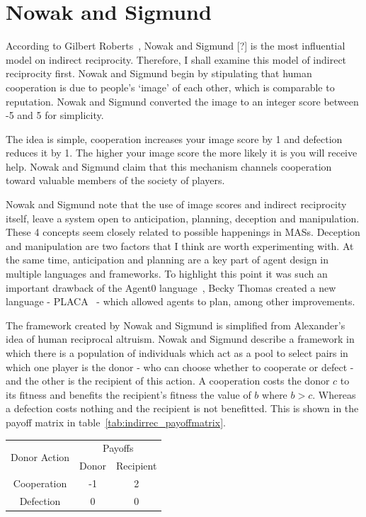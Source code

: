 \documentclass[]{final_report}
\begin{document}
\section{Nowak and Sigmund}
\label{sec:nowak_sig}
According to Gilbert Roberts~\cite{evoldirindir}, Nowak and Sigmund [?] is the most influential model on indirect reciprocity. Therefore, I shall examine this model of indirect reciprocity first. Nowak and Sigmund begin by stipulating that human cooperation is due to people's `image' of each other, which is comparable to reputation. Nowak and Sigmund converted the image to an integer score between -5 and 5 for simplicity.\par
The idea is simple, cooperation increases your image score by 1 and defection reduces it by 1. The higher your image score the more likely it is you will receive help. Nowak and Sigmund claim that this mechanism channels cooperation toward valuable members of the society of players.\par
Nowak and Sigmund note that the use of image scores and indirect reciprocity itself, leave a system open to anticipation, planning, deception and manipulation. These 4 concepts seem closely related to possible happenings in MASs. Deception and manipulation are two factors that I think are worth experimenting with. At the same time, anticipation and planning are a key part of agent design in multiple languages and frameworks. To highlight this point it was such an important drawback of the Agent0 language~\cite{shoham1991agent0}, Becky Thomas created a new language - PLACA~\cite{thomas1993placa} - which allowed agents to plan, among other improvements.\par
The framework created by Nowak and Sigmund is simplified from Alexander's~\cite{alexander1987biology} idea of human reciprocal altruism. Nowak and Sigmund describe a framework in which there is a population of individuals which act as a pool to select pairs in which one player is the donor - who can choose whether to cooperate or defect - and the other is the recipient of this action. A cooperation costs the donor $c$ to its fitness and benefits the recipient's fitness the value of $b$ where $b>c$. Whereas a defection costs nothing and the recipient is not benefitted. This is shown in the payoff matrix in table~\ref{tab:indirrec_payoffmatrix}.\par
\begin{framed}
	\begin{center}
		\begin{tabular}{c|c|c}
		\multirow{2}{*}{Donor Action} & \multicolumn{2}{c}{Payoffs}\\	
		& Donor & Recipient\\
		\hline
		Cooperation & -1 & 2\\
		\hline
		Defection & 0 & 0\\
		\end{tabular}
		\label{tab:indirrec_payoffmatrix}
	\end{center}	
\end{framed}
\end{document}
